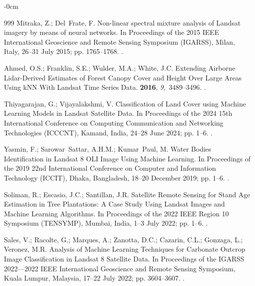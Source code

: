 \documentclass[jimaging,article,accept,pdftex,oneauthor]{Definitions/mdpi}
\begin{document}
\begin{adjustwidth}{-\extralength}{0cm}
\begin{thebibliography}{999}
Mitraka, Z.; Del~Frate, F.
\newblock Non-linear spectral mixture analysis of Landsat imagery by means of
  neural networks.
\newblock In Proceedings of the 2015 IEEE International Geoscience and Remote
  Sensing Symposium (IGARSS), {Milan, Italy, 26--31 July} 2015; pp. 1765--1768.
.

Ahmed, O.S.; Franklin, S.E.; Wulder, M.A.; White, J.C.
\newblock Extending Airborne Lidar-Derived Estimates of Forest Canopy Cover and
  Height Over Large Areas Using kNN With Landsat Time Series Data.
 {\bf 2016}, {\em 9},~3489--3496.
.

Thiyagarajan, G.; Vijayalakshmi, V.
\newblock Classification of Land Cover using Machine Learning Models in Landsat
  Satellite Data.
\newblock In Proceedings of the 2024 15th International Conference on Computing
  Communication and Networking Technologies (ICCCNT), {Kamand, India,  24--28 June} 2024; pp. 1--6.
.

Yasmin, F.; Sarowar~Sattar, A.H.M.; Kumar~Paul, M.
\newblock Water Bodies Identification in Landsat 8 OLI Image Using Machine
  Learning.
\newblock In Proceedings of the 2019 22nd International Conference on Computer
  and Information Technology (ICCIT),  {Dhaka, Bangladesh, 18--20 December} 2019; pp. 1--6.
.

Soliman, R.; Escasio, J.C.; Santillan, J.R.
\newblock Satellite Remote Sensing for Stand Age Estimation in Tree
  Plantations: A Case Study Using Landsat Images and Machine Learning
  Algorithms.
\newblock In Proceedings of the 2022 IEEE Region 10 Symposium (TENSYMP), {Mumbai, India, 1--3 July} 2022;
  pp. 1--6.
.

Sales, V.; Racolte, G.; Marques, A.; Zanotta, D.C.; Cazarin, C.L.; Gonzaga, L.;
  Veronez, M.R.
\newblock Analysis of Machine Learning Techniques for Carbonate Outcrop Image
  Classification in Landsat 8 Satellite Data.
\newblock In Proceedings of the IGARSS 2022---2022 IEEE International
  Geoscience and Remote Sensing Symposium, {Kuala Lumpur, Malaysia, 17--22 July }2022; pp. 3604--3607.
.


\end{thebibliography}
\end{adjustwidth}
\end{document}
